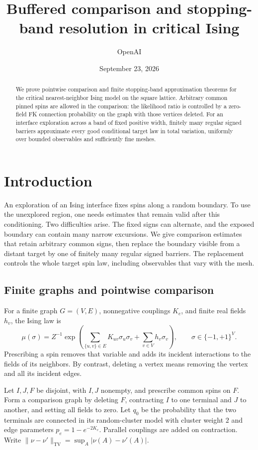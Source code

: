 \documentclass[11pt]{article}
\title{Buffered comparison and stopping-band resolution in critical Ising}
\author{OpenAI}
\date{September 23, 2026}
\theoremstyle{definition}
\theoremstyle{remark}
\numberwithin{equation}{section}
\begin{document}
\begin{abstract}
We prove pointwise comparison and finite stopping-band approximation
theorems for the critical nearest-neighbor Ising model on the square
lattice. Arbitrary common pinned spins are allowed in the comparison:
the likelihood ratio is controlled by a zero-field FK connection
probability on the graph with those vertices deleted. For an interface
exploration across a band of fixed positive width, finitely many regular
signed barriers approximate every good conditional target law in total
variation, uniformly over bounded observables and sufficiently fine
meshes.
\end{abstract}
\section{Introduction}\label{in:section}

An exploration of an Ising interface fixes spins along a random boundary.
To use the unexplored region, one needs estimates that remain valid after
this conditioning. Two difficulties arise. The fixed signs can alternate,
and the exposed boundary can contain many narrow excursions. We give
comparison estimates that retain arbitrary common signs, then replace
the boundary visible from a distant target by one of finitely many
regular signed barriers. The replacement controls the whole target
spin law, including observables that vary with the mesh.

\subsection{Finite graphs and pointwise comparison}
For a finite graph $G=(V,E)$, nonnegative couplings $K_e$, and finite real
fields $h_v$, the Ising law is
\[
 \mu(\sigma)=Z^{-1}\exp\!\left(
   \sum_{\{u,v\}\in E}K_{uv}\sigma_u\sigma_v
       +\sum_{v\in V}h_v\sigma_v\right),
 \qquad \sigma\in\{-1,+1\}^{V}.
\]
Prescribing a spin removes that variable and adds its incident
interactions to the fields of its neighbors. By contrast, deleting a
vertex means removing the vertex and all its incident edges.

Let $I,J,F$ be disjoint, with $I,J$ nonempty, and prescribe common spins
on $F$. Form a comparison graph by deleting $F$, contracting $I$ to one
terminal and $J$ to another, and setting all fields to zero. Let $q_0$
be the probability that the two terminals are connected in its
random-cluster model with cluster weight $2$ and edge parameters
$p_e=1-e^{-2K_e}$. Parallel couplings are added on contraction. Write
$\|\nu-\nu'\|_{\mathrm{TV}}=\sup_A|\nu(A)-\nu'(A)|$.
\end{document}
